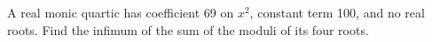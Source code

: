 A real monic quartic has coefficient 69 on $x^2$, constant term 100, and no real roots. Find the infimum of the sum of the moduli of its four roots.
